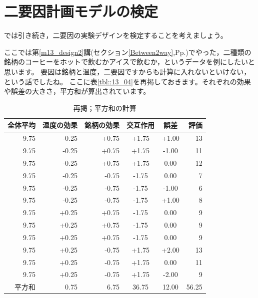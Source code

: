 \documentclass{ltjbook}
\begin{document}
			\section{二要因計画モデルの検定}
			では引き続き，二要因の実験デザインを検定することを考えましょう。

			ここでは第\ref{m13_design2}講(セクション\ref{Between2way},Pp.\pageref{Between2way})でやった，二種類の銘柄のコーヒーをホットで飲むかアイスで飲むか，というデータを例にしたいと思います。
			要因は銘柄と温度，二要因ですからも計算に入れないといけない，という話でしたね。
			ここに表\ref{tbl::13_04}を再掲しておきます。それぞれの効果や誤差の大きさ，平方和が算出されています。
			\begin{table}[ht]
				\centering
				\caption{再掲；平方和の計算}
				\begin{tabular}{rrrccr}
					\hline
					全体平均 & 温度の効果 & 銘柄の効果 & 交互作用  & 誤差    & 評価    \\
					\hline
					9.75 & -0.25 & +0.75 & +1.75 & +1.00 & 13    \\
					9.75 & -0.25 & +0.75 & +1.75 & -1.00 & 11    \\
					9.75 & -0.25 & +0.75 & +1.75 & 0.00  & 12    \\ \hline
					9.75 & -0.25 & -0.75 & -1.75 & 0.00  & 7     \\
					9.75 & -0.25 & -0.75 & -1.75 & -1.00 & 6     \\
					9.75 & -0.25 & -0.75 & -1.75 & +1.00 & 8     \\ \hline
					9.75 & +0.25 & +0.75 & -1.75 & 0.00  & 9     \\
					9.75 & +0.25 & +0.75 & -1.75 & 0.00  & 9     \\
					9.75 & +0.25 & +0.75 & -1.75 & 0.00  & 9     \\ \hline
					9.75 & +0.25 & -0.75 & +1.75 & +2.00 & 13    \\
					9.75 & +0.25 & -0.75 & +1.75 & 0.00  & 11    \\
					9.75 & +0.25 & -0.75 & +1.75 & -2.00 & 9     \\
					\hline\hline
					平方和  & 0.75  & 6.75  & 36.75 & 12.00 & 56.25 \\\hline
				\end{tabular}
				\label{tbl::21_06}
			\end{table}
\end{document}
